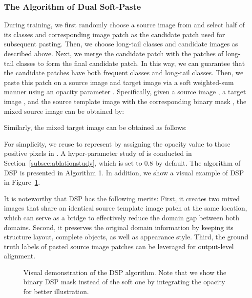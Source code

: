 \documentclass[sigconf]{acmart}
\begin{document}
\subsubsection{The Algorithm of Dual Soft-Paste}
During training, we first randomly choose a source image from  and select half of its classes and corresponding image patch as the candidate patch used for subsequent pasting. Then, we choose long-tail classes and candidate images as described above. Next, we merge the candidate patch with the patches of long-tail classes to form the final candidate patch. In this way, we can guarantee that the candidate patches have both frequent classes and long-tail classes. Then, we paste this patch on a source image and target image via a soft weighted-sum manner using an opacity parameter . Specifically, given a source image , a target image , and the source template image  with the corresponding binary mask , the mixed source image  can be obtained by:

Similarly, the mixed target image  can be obtained as follows:

For simplicity, we reuse  to represent  by assigning the opacity value to those positive pixels in . A hyper-parameter study of  is conducted in Section~\ref{subsec:ablationstudy}, which is set to 0.8 by default. The algorithm of DSP is presented in Algorithm 1. In addition, we show a visual example of DSP in Figure~\ref{dsp_images}.

It is noteworthy that DSP has the following merits: First, it creates two mixed images that share an identical source template image patch at the same location, which can serve as a bridge to effectively reduce the domain gap between both domains. Second, it preserves the original domain information by keeping its structure layout, complete objects, as well as appearance style. Third, the ground truth labels of pasted source image patches can be leveraged for output-level alignment. 



\begin{figure}[t]
    \centering
    
    
    \caption{Visual demonstration of the DSP algorithm. Note that we show the binary DSP mask instead of the soft one by integrating the opacity  for better illustration. }
    \label{dsp_images}
\end{figure}
\end{document}
